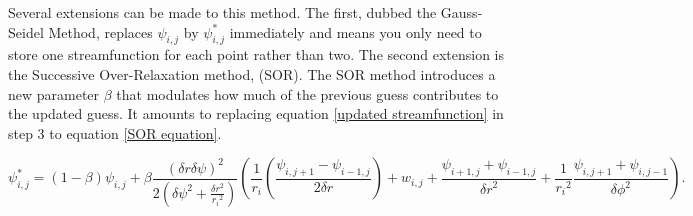 \documentclass{article}
\begin{document}
Several extensions can be made to this method. The first, dubbed the Gauss-Seidel Method, replaces $\psi_{i,j}$ by $\psi_{i,j}^{*}$ immediately and means you only need to store one streamfunction for each point rather than two. The second extension is the Successive Over-Relaxation method, (SOR). The SOR method introduces a new parameter $\beta$ that modulates how much of the previous guess contributes to the updated guess. It amounts to replacing equation \ref{updated streamfunction} in step 3 to equation \ref{SOR equation}.

\begin{equation}
	\psi_{i,j}^{*} = (1- \beta)\psi_{i,j} +  \beta \frac{(\delta r \delta \psi)^2}{2 ( {\delta \psi}^2 + \frac{ {\delta r}^2}{{r_i}^2})} ( \frac{1}{r_i} (\frac{\psi_{i,j+1}-\psi_{i-1,j}}{2 \delta r}) +w_{i,j} + \frac{\psi_{i+1,j} + \psi_{i-1,j}}{ {\delta r}^2 } + \frac{1}{ {r_i}^2 } \frac{\psi_{i,j+1} + \psi_{i,j-1}}{ {\delta \phi}^2 }  ).
	\label{SOR equation}
\end{equation}
\end{document}
